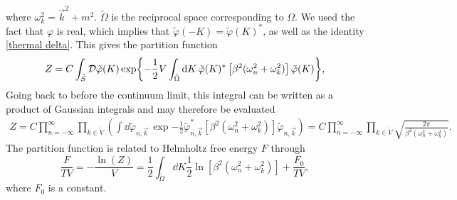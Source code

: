 where $\omega_k^2 = \vec k^2 + m^2$.
$\tilde \Omega$ is the reciprocal space corresponding to $\Omega$.
We used the fact that $\varphi$ is real, which implies that $\tilde \varphi(-K) = \tilde \varphi(K)^*$, as well as the identity \autoref{thermal delta}.
This gives the partition function 
\begin{equation}
    Z = C \int_{\tilde S} \mathcal{D} \tilde \varphi(K) 
    \exp{
        -  \frac{1}{2} V \int_{\tilde \Omega} \dd K \, 
        \tilde \varphi(K)^* \left[\beta^2 (\omega_n^2+ \omega_k^2)\right] \tilde \varphi(K)
    },
\end{equation}
Going back to before the continuum limit, this integral can be written as a product of Gaussian integrals and may therefore be evaluated
\begin{align*}
    Z = C \prod_{n=-\infty}^\infty \prod_{k \in \tilde V}
    \left(
        \int \dd \tilde \varphi_{n, \vec k} \,
        \exp{
            - \frac{1}{2} \tilde \varphi_{n, \vec k}^*
            \left[\beta^2 (\omega_n^2+ \omega_k^2)\right] 
            \tilde \varphi_{n, \vec k}
            }
    \right)
    = 
    C \prod_{n=-\infty}^\infty \prod_{k \in \tilde V} 
    \sqrt{\frac{2 \pi}{\beta^2 (\omega_n^2 + \omega_k^2)}}.
\end{align*}
The partition function is related to Helmholtz free energy $F$ through
\begin{equation}
    \label{result free scalar 1}
    \frac{F}{T V}= - \frac{\ln(Z)}{V} = \frac{1}{2} \int_{\tilde \Omega} \dd K \frac{1}{2} \ln[\beta^2(\omega_n^2 + \omega_k^2)] + \frac{F_0}{TV},
\end{equation}
where $F_0$ is a constant.

